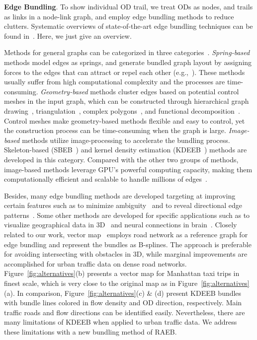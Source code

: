 \noindent
\textbf{Edge Bundling}.
To show individual OD trail, we treat ODs as nodes, and trails as links in a node-link graph, and employ edge bundling methods to reduce clutters.
Systematic overviews of state-of-the-art edge bundling techniques can be found in~\cite{zhou2013edge, lhuillier2017state}.
Here, we just give an overview.

Methods for general graphs can be categorized in three categories~\cite{zhou2013edge}.
\textit{Spring-based} methods model edges as springs, and generate bundled graph layout by assigning forces to the edges that can attract or repel each other (e.g.,~\cite{holten2009force}).
These methods usually suffer from high computational complexity and the processes are time-consuming.
\textit{Geometry-based} methods cluster edges based on potential control meshes in the input graph, which can be constructed through hierarchical graph drawing~\cite{holten2006hierarchical}, triangulation~\cite{zhou2008energy, lambert2010winding}, complex polygons~\cite{cui2008geometry}, and functional decomposition~\cite{hurter_2018_functional}.
Control meshes make geometry-based methods flexible and easy to control, yet the construction process can be time-consuming when the graph is large. 
\textit{Image-based} methods utilize image-processing to accelerate the bundling process.
Skeleton-based (SBEB~\cite{ersoy2011skeleton}) and kernel density estimation (KDEEB~\cite{hurter2012graph}) methods are developed in this category.
Compared with the other two groups of methods, image-based methods leverage GPU's powerful computing capacity, making them computationally efficient and scalable to handle millions of edges~\cite{van2016cubu, lhuillier2017ffteb}.

Besides, many edge bundling methods are developed targeting at improving certain features such as to minimize ambiguity~\cite{luo2012ambiguity, bach_2017_towards} and to reveal directional edge patterns~\cite{selassie_2011_divided}.
Some other methods are developed for specific applications such as to visualize geographical data in 3D~\cite{lambert20103d, thony2015vector} and neural connections in brain~\cite{2014_bottger_three-d, yang_2017_blockwise}.
Closely related to our work, vector map~\cite{thony2015vector} employs road network as a reference graph for edge bundling and represent the bundles as B-splines.
The approach is preferable for avoiding intersecting with obstacles in 3D, while marginal improvements are accomplished for urban traffic data on dense road networks.
Figure~\ref{fig:alternatives}(b) presents a vector map for Manhattan taxi trips in finest scale, which is very close to the original map as in Figure~\ref{fig:alternatives}(a).
In comparison, Figure~\ref{fig:alternatives}(c) \& (d) present KDEEB bundles with bundle lines colored in flow density and OD direction, respectively.
Main traffic roads and flow directions can be identified easily.
Nevertheless, there are many limitations of KDEEB when applied to urban traffic data.
We address these limitations with a new bundling method of RAEB.